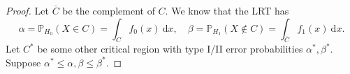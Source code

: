 \documentclass[egregdoesnotlikesansseriftitles,a4paper]{scrartcl}
\begin{document}
\begin{proof}
      Let $\overline{C}$ be the complement of $C$. We know that the LRT has \[
      \alpha =\mathbb{P}_{H_0 } (X \in C) =\int_{C}^{}f_{0} (x) \ \mathrm{d} x, \quad \beta  =\mathbb{P}_{H_1 } (X \notin C) =\int_{\overline{C}}^{}f_{1} (x) \ \mathrm{d} x
      .\] Let $C^{*}$ be some other critical region with type I/II error probabilities $\alpha ^* ,\beta ^* $. Suppose $\alpha ^* \leq \alpha , \beta  \leq \beta ^*$.
\end{proof}
\end{document}
